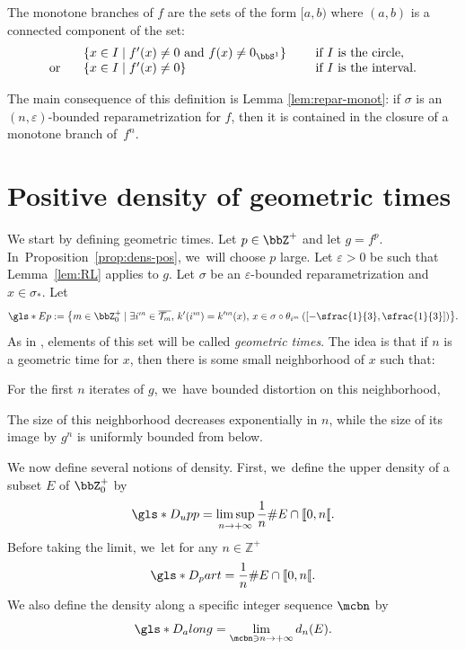 \begin{definition}
\label{def:monot-branche}
The monotone branches of $f$ are the sets of the form $[a,b)$ where $(a,b)$ is a connected component of the set:
\[
\begin{array}{l l l}
&\{ x \in I \mid f'(x) \neq 0 \text{ and } f(x) \neq 0_{\bbS^1} \} \quad &\text{ if } I \text{ is the circle},\\
\text{or}\;\;\;
&\{ x \in I \mid f'(x) \neq 0 \} &\text{ if } I \text{ is the interval}.
\end{array}
\]
\end{definition}

The main consequence of this definition is Lemma \ref{lem:repar-monot}: if $\sigma$ is an $(n, \varepsilon)$-bounded reparametrization for $f$, then it is contained in the closure of a monotone branch of~$f^n$.

\section{Positive density of geometric times}
\label{sec:dens-geom}

We start by defining geometric times.
Let $p \in \bbZ^+$ and let $g = f^p$. In~Proposition~\ref{prop:dens-pos}, we~will choose $p$ large.
Let $\varepsilon > 0$ be such that Lemma~\ref{lem:RL} applies to $g$. Let $\sigma$ be an $\varepsilon$-bounded reparametrization and $x \in \sigma_*$.
Let
\[
\gls*{Ep} := \bigl \{ m \in \bbZ_0^+ \mid \exists i^m \in \overline{\mathcal{T}_m},\, k'(i^m) = k'^m(x),\, x \in \sigma \circ \theta_{i^m} \left (\left [ - \sfrac{1}{3}, \sfrac{1}{3} \right ] \right) \bigr \}.
\]
As in \cite{MR4701884}, elements of this set will be called \textit{geometric times}.
The idea is that if $n$ is a geometric time for $x$, then there is some small neighborhood of $x$ such that:
\begin{enumeratei}
\item
For the first $n$ iterates of $g$, we~have bounded distortion on this neighborhood,
\item
The size of this neighborhood decreases exponentially in $n$, while the size of its image by $g^n$ is uniformly bounded from below.
\end{enumeratei}

We now define several notions of density. First, we~define the upper density of a subset $E$ of $\bbZ_0^+$ by
\[
\gls*{D_upp} = \limsup_{n \to +\infty} \frac{1}{n} \# E \cap [\![ 0, n [\![.
\]
Before taking the limit, we~let for any $n \in \mathbb{Z^+}$
\[
\gls*{D_part} = \frac{1}{n} \# E \cap [\![ 0, n [\![.
\]
We also define the density along a specific integer sequence $\mcbn$ by
\[
\gls*{D_along} = \lim_{\mcbn \ni n \to +\infty} d_n(E).
\]

